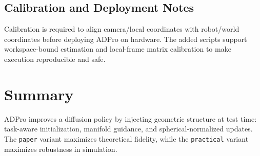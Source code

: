 \documentclass[11pt,a4paper]{article}
\begin{document}
\subsection{Calibration and Deployment Notes}
Calibration is required to align camera/local coordinates with robot/world coordinates before deploying ADPro on hardware.
The added scripts support workspace-bound estimation and local-frame matrix calibration to make execution reproducible and safe.

\section{Summary}
ADPro improves a diffusion policy by injecting geometric structure at test time:
task-aware initialization, manifold guidance, and spherical-normalized updates.
The \texttt{paper} variant maximizes theoretical fidelity, while the \texttt{practical} variant maximizes robustness in simulation.
\end{document}
